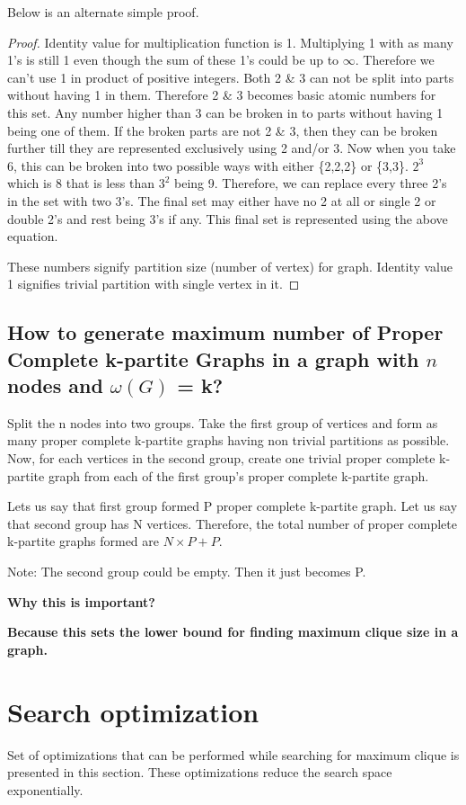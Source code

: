 \documentclass[12pt]{article}
\theoremstyle{plain}
\theoremstyle{definition}
\begin{document}
Below is an alternate simple proof.

\begin{proof}
	Identity value for multiplication function is 1. Multiplying 1 with as many 1's is still 1 even though the sum of these 1's could be up to $\infty$. Therefore we can't use 1 in product of positive integers. Both 2 \& 3 can not be split into parts without having 1 in them. Therefore 2 \& 3 becomes basic atomic numbers for this set. Any number higher than 3 can be broken in to parts without having 1 being one of them. If the broken parts are not 2 \& 3, then they can be broken further till they are represented exclusively using 2 and/or 3. Now when you take 6, this can be broken into two possible ways with either \{2,2,2\} or \{3,3\}. $2^3$ which is 8 that is less than $3^2$ being 9. Therefore, we can replace every three 2's in the set with two 3's. The final set may either have no 2 at all or single 2 or double 2's and rest being 3's if any. This final set is represented using the above equation.
	
	These numbers signify partition size (number of vertex) for graph. Identity value 1 signifies trivial partition with single vertex in it.
\end{proof}

\subsection{How to generate maximum number of Proper Complete k-partite Graphs in a graph with $n$ nodes and $\omega(G)$ = k?}

Split the n nodes into two groups. Take the first group of vertices and form as many proper complete k-partite graphs having non trivial partitions as possible. Now, for each vertices in the second group, create one trivial proper complete k-partite graph from each of the first group's proper complete k-partite graph.

Lets us say that first group formed P proper complete k-partite graph. Let us say that second group has N vertices. Therefore, the total number of proper complete k-partite graphs formed are $N \times P + P$.

Note: The second group could be empty. Then it just becomes P.

\textbf{Why this is important?}

\textbf{Because this sets the lower bound for finding maximum clique size in a graph.}

\section{Search optimization}
Set of optimizations that can be performed while searching for maximum clique is presented in this section. These optimizations reduce the search space exponentially.
\end{document}
